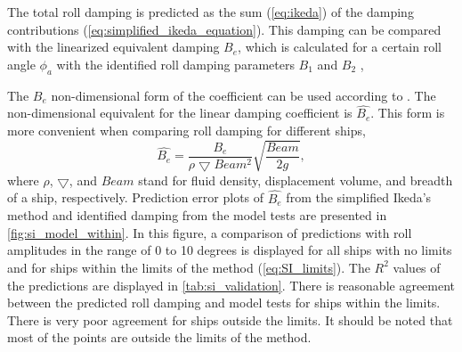\noindent The total roll damping is predicted as the sum (\autoref{eq:ikeda}) of the damping contributions (\autoref{eq:simplified_ikeda_equation}). This damping can be compared with the linearized equivalent damping $B_e$, which is calculated for a certain roll angle $\phi_a$ with the identified roll damping parameters $B_1$ and $B_2$ \cite{himenoPredictionShipRoll1981},


\noindent The $B_e$ non-dimensional form of the coefficient can be used according to \textcite{himenoPredictionShipRoll1981}. The non-dimensional equivalent for the linear damping coefficient is $\hat{B_e}$. This form is more convenient when comparing roll damping for different ships,
\begin{equation} \label{eq:be_eqvalent}
    \hat{B_e} = \frac{B_e}{\rho \bigtriangledown Beam^2} \sqrt{\frac{Beam}{2g}},
\end{equation}
\noindent where $\rho$, $\bigtriangledown$, and $Beam$ stand for fluid density, displacement volume, and breadth of a ship, respectively. Prediction error plots of $\hat{B_e}$ from the simplified Ikeda's method and identified damping from the model tests are presented in \autoref{fig:si_model_within}. In this figure, a comparison of predictions with roll amplitudes in the range of 0 to 10 degrees is displayed for all ships with no limits and for ships within the limits of the method (\autoref{eq:SI_limits}). The $R^2$ values of the predictions are displayed in \autoref{tab:si_validation}. There is reasonable agreement between the predicted roll damping and model tests for ships within the limits. There is very poor agreement for ships outside the limits. It should be noted that most of the points are outside the limits of the method.

